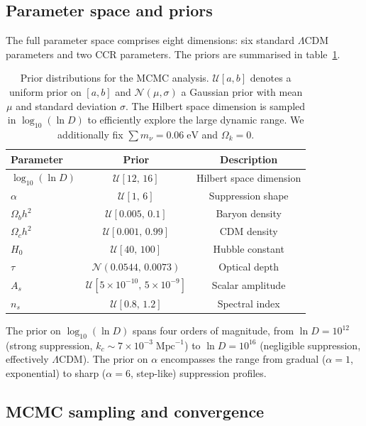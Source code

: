 \subsection{Parameter space and priors}

The full parameter space comprises eight dimensions: six standard
$\Lambda$CDM parameters and two CCR parameters. The priors are
summarised in table~\ref{tab:priors}.

\begin{table}[t]
\centering
\begin{tabular}{lcc}
\toprule
Parameter & Prior & Description \\
\midrule
$\log_{10}(\ln D)$ & $\mathcal{U}[12,\,16]$ & Hilbert space dimension \\
$\alpha$ & $\mathcal{U}[1,\,6]$ & Suppression shape \\
$\Omega_b h^2$ & $\mathcal{U}[0.005,\,0.1]$ & Baryon density \\
$\Omega_c h^2$ & $\mathcal{U}[0.001,\,0.99]$ & CDM density \\
$H_0$ & $\mathcal{U}[40,\,100]$ & Hubble constant \\
$\tau$ & $\mathcal{N}(0.0544,\,0.0073)$ & Optical depth \\
$A_s$ & $\mathcal{U}[5 \times 10^{-10},\,5 \times 10^{-9}]$ & Scalar amplitude \\
$n_s$ & $\mathcal{U}[0.8,\,1.2]$ & Spectral index \\
\bottomrule
\end{tabular}
\caption{Prior distributions for the MCMC analysis.
  $\mathcal{U}[a,b]$ denotes a uniform prior on $[a,b]$ and
  $\mathcal{N}(\mu,\sigma)$ a Gaussian prior with mean $\mu$ and
  standard deviation $\sigma$. The Hilbert space dimension is sampled
  in $\log_{10}(\ln D)$ to efficiently explore the large dynamic range.
  We additionally fix $\sum m_\nu = 0.06\;\mathrm{eV}$ and
  $\Omega_k = 0$.}
\label{tab:priors}
\end{table}

The prior on $\log_{10}(\ln D)$ spans four orders of magnitude, from
$\ln D = 10^{12}$ (strong suppression,
$k_c \sim 7 \times 10^{-3}\;\mathrm{Mpc}^{-1}$) to $\ln D = 10^{16}$
(negligible suppression, effectively $\Lambda$CDM). The prior on
$\alpha$ encompasses the range from gradual ($\alpha = 1$, exponential)
to sharp ($\alpha = 6$, step-like) suppression profiles.

\subsection{MCMC sampling and convergence}

